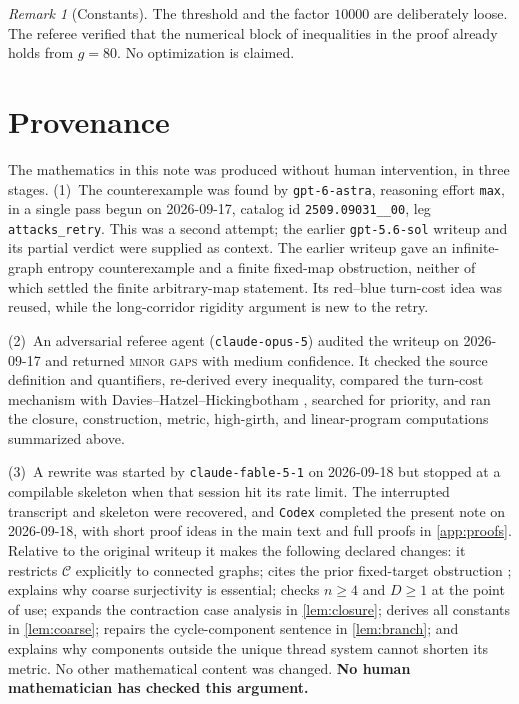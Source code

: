 \documentclass[11pt,a4paper]{article}
\theoremstyle{plain}
\theoremstyle{definition}
\theoremstyle{remark}
\newtheorem{remark}[theorem]{Remark}
\newcommand{\cC}{\mathcal C}
\begin{document}
\begin{remark}[Constants]
The threshold and the factor $10000$ are deliberately loose. The referee verified that the numerical block of inequalities in the proof already holds from $g=80$. No optimization is claimed.
\end{remark}

\section{Provenance}\label{sec:provenance}

The mathematics in this note was produced without human intervention, in three stages.
(1)~The counterexample was found by \texttt{gpt-6-astra}, reasoning effort \texttt{max}, in a single pass begun on 2026-09-17, catalog id \texttt{2509.09031\_\_00}, leg \texttt{attacks\_retry}. This was a second attempt; the earlier \texttt{gpt-5.6-sol} writeup and its partial verdict were supplied as context. The earlier writeup gave an infinite-graph entropy counterexample and a finite fixed-map obstruction, neither of which settled the finite arbitrary-map statement. Its red--blue turn-cost idea was reused, while the long-corridor rigidity argument is new to the retry.

(2)~An adversarial referee agent (\texttt{claude-opus-5}) audited the writeup on 2026-09-17 and returned \textsc{minor gaps} with medium confidence. It checked the source definition and quantifiers, re-derived every inequality, compared the turn-cost mechanism with Davies--Hatzel--Hickingbotham \cite{DHH25}, searched for priority, and ran the closure, construction, metric, high-girth, and linear-program computations summarized above.

(3)~A rewrite was started by \texttt{claude-fable-5-1} on 2026-09-18 but stopped at a compilable skeleton when that session hit its rate limit. The interrupted transcript and skeleton were recovered, and \texttt{Codex} completed the present note on 2026-09-18, with short proof ideas in the main text and full proofs in \cref{app:proofs}. Relative to the original writeup it makes the following declared changes: it restricts $\cC$ explicitly to connected graphs; cites the prior fixed-target obstruction \cite{DHH25}; explains why coarse surjectivity is essential; checks $n\ge4$ and $D\ge1$ at the point of use; expands the contraction case analysis in \cref{lem:closure}; derives all constants in \cref{lem:coarse}; repairs the cycle-component sentence in \cref{lem:branch}; and explains why components outside the unique thread system cannot shorten its metric. No other mathematical content was changed. \textbf{No human mathematician has checked this argument.}
\end{document}
